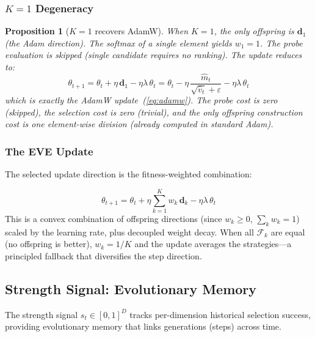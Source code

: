 \documentclass[12pt]{article}
\newcommand{\eqbox}[2]{%
  \begin{tcolorbox}[eqstyle, title={#1}]
    #2
  \end{tcolorbox}
}
\newtheorem{proposition}{Proposition}
\begin{document}
\subsubsection{$K = 1$ Degeneracy}

\begin{proposition}[$K = 1$ recovers AdamW]
\label{prop:k1}
When $K = 1$, the only offspring is $\mathbf{d}_1$ (the Adam direction).
The softmax of a single element yields $w_1 = 1$.
The probe evaluation is skipped (single candidate requires no ranking).
The update reduces to:
\begin{equation}
  \theta_{t+1} = \theta_t + \eta\,\mathbf{d}_1 - \eta\lambda\,\theta_t
  = \theta_t - \eta\,\frac{\hat{m}_t}{\sqrt{\hat{v}_t} + \varepsilon}
    - \eta\lambda\,\theta_t
  \label{eq:k1_adam}
\end{equation}
which is exactly the AdamW update~(\cref{eq:adamw}).
The probe cost is zero (skipped), the selection cost is zero (trivial),
and the only offspring construction cost is one element-wise division
(already computed in standard Adam).
\end{proposition}

\subsubsection{The EVE Update}

The selected update direction is the fitness-weighted combination:

\eqbox{Definition 4 \textemdash\ The EVE Update}{
\begin{equation}
  \theta_{t+1} = \theta_t
    + \eta \sum_{k=1}^{K} w_k\,\mathbf{d}_k
    - \eta\lambda\,\theta_t
  \label{eq:eve_update}
\end{equation}
\smallskip
This is a convex combination of offspring directions (since
$w_k \geq 0$, $\sum_k w_k = 1$) scaled by the learning rate, plus
decoupled weight decay.
When all $\mathcal{F}_k$ are equal (no offspring is better),
$w_k = 1/K$ and the update averages the strategies---a principled
fallback that diversifies the step direction.
}


\subsection{Strength Signal: Evolutionary Memory}
\label{ssec:strength}

The strength signal $s_t \in [0, 1]^D$ tracks per-dimension historical
selection success, providing evolutionary memory that links generations
(steps) across time.
\end{document}
